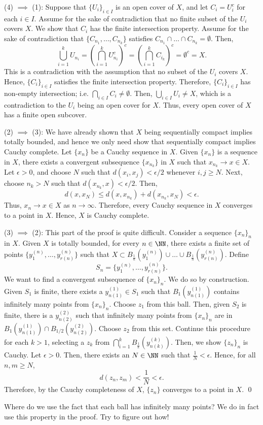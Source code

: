 (4) $\implies$ (1): Suppose that $\{U_i\}_{i\in I}$ is an open cover of $X$, and let $C_i = U_i^c$ for each $i\in I$. Assume for the sake of contradiction that no finite subset of the $U_i$ covers $X$. We show that $C_i$ has the finite intersection property. Assume for the sake of contradiction that $\{C_{n_1}, \dots, C_{n_k}\}$ satisfies $C_{n_1} \cap \dots \cap C_{n_k} = \emptyset$. Then, 
\[
    \bigcup_{i=1}^k U_{n_i} = \left(\bigcap_{i=1}^k U_{n_i}^c\right)^c = \left(\bigcap_{i=1}^k C_{i_k}\right)^c = \emptyset^c = X.
\]
This is a contradiction with the assumption that no subset of the $U_i$ covers $X.$ Hence, $\{C_i\}_{i\in I}$ satisfies the finite intersection property. Therefore, $\{C_i\}_{i\in I}$ has non-empty intersection; i.e. $\bigcap_{i\in I} C_i \neq \emptyset$. Then, $\bigcup_{i\in I} U_i \neq X$, which is a contradiction to the $U_i$ being an open cover for $X$. Thus, every open cover of $X$ has a finite open subcover.

(2) $\implies$ (3): We have already shown that $X$ being sequentially compact implies totally bounded, and hence we only need show that sequentially compact implies Cauchy complete. Let $\{x_n\}$ be a Cauchy sequence in $X$. Given $\{x_n\}$ is a sequence in $X$, there exists a convergent subsequence $\{x_{n_k}\}$ in $X$ such that $x_{n_k} \to x \in X$. Let $\epsilon>0$, and choose $N$ such that $d(x_i, x_j) < \epsilon/2$ whenever $i,j\geq N$. Next, choose $n_k>N$ such that $d(x_{n_k}, x) <\epsilon/2$. Then, 
\[
d(x,x_N) \leq d(x,x_{n_k}) + d(x_{n_k},x_N) < \epsilon.
\]
Thus, $x_n \to x\in X$ as $n\to \infty$. Therefore, every Cauchy sequence in $X$ converges to a point in $X$. Hence, $X$ is Cauchy complete. 

(3) $\implies$ (2): This part of the proof is quite difficult. Consider a sequence $\{x_n\}_n$ in $X$. Given $X$ is totally bounded, for every $n\in \NN$, there exists a finite set of points $\{y_{1}^{(n)}, \dots, y_{r(n)}^{(n)}\}$ such that $X\subset B_{\frac 1n} (y_1^{(n)}) \cup \dots \cup B_{\frac 1n} (y_{r(n)}^{(n)})$. Define 
\[
S_n = \{y_1^{(n)}, \dots, y_{r(n)}^{(n)}\}.
\]
We want to find a convergent subsequence of $\{x_n\}_n$. We do so by construction. Given $S_1$ is finite, there exists a $y_{n(1)}^{(1)}\in S_1$ such that $B_1(y_{n(1)}^{(1)})$ contains infinitely many points from $\{x_n\}_n$. Choose $z_1$ from this ball. Then, given $S_2$ is finite, there is a $y_{n(2)}^{(2)}$ such that infinitely many points from $\{x_n\}_n$ are in $B_1(y_{n(1)}^{(1)}) \cap B_{1/2}(y_{n(2)}^{(2)})$. Choose $z_2$ from this set. Continue this procedure for each $k >1$, selecting a $z_k$ from $\bigcap_{i=1}^k B_{\frac 1k}(y_{n(k)}^{(k)})$. Then, we show $\{z_n\}_n$ is Cauchy. Let $\epsilon>0$. Then, there exists an $N\in \NN$ such that $\frac{1}{N} < \epsilon$. Hence, for all $n,m \geq N$, 
\[
d(z_n, z_m) <  \frac{1}{N}< \epsilon.
\]
Therefore, by the Cauchy completeness of $X$, $\{z_n\}$ converges to a point in $X$. \qed 

\begin{remark}
Where do we use the fact that each ball has infinitely many points? We do in fact use this property in the proof. Try to figure out how!
\end{remark}
